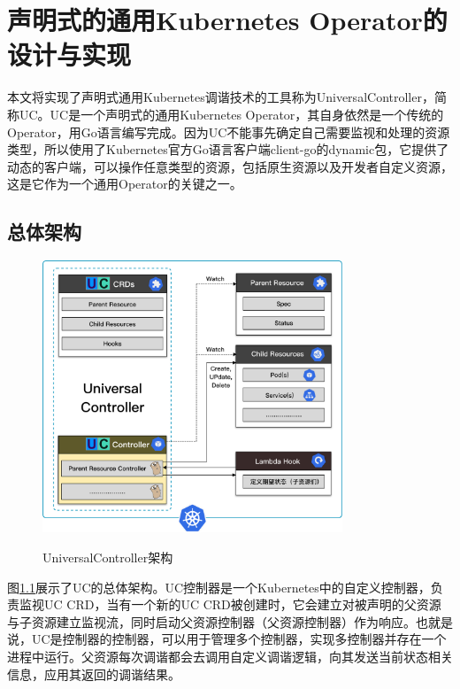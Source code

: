 \documentclass[macfonts,master]{njuthesis}
\begin{document}
\chapter{声明式的通用Kubernetes Operator的设计与实现}\label{chapter_implement}

本文将实现了声明式通用Kubernetes调谐技术的工具称为UniversalController，简称UC。UC是一个声明式的通用Kubernetes Operator，其自身依然是一个传统的Operator，用Go语言编写完成。因为UC不能事先确定自己需要监视和处理的资源类型，所以使用了Kubernetes官方Go语言客户端client-go的dynamic包，它提供了动态的客户端，可以操作任意类型的资源，包括原生资源以及开发者自定义资源，这是它作为一个通用Operator的关键之一。

\section{总体架构}

\begin{figure}[htbp]
  \centering
  \includegraphics[width=0.8\textwidth]{pics/uc-arch.pdf}\\
  \caption{UniversalController架构}\label{fig:uc-arch}
\end{figure}

图\ref{fig:uc-arch}展示了UC的总体架构。UC控制器是一个Kubernetes中的自定义控制器，负责监视UC CRD，当有一个新的UC CRD被创建时，它会建立对被声明的父资源与子资源建立监视流，同时启动父资源控制器（父资源控制器）作为响应。也就是说，UC是控制器的控制器，可以用于管理多个控制器，实现多控制器并存在一个进程中运行。父资源每次调谐都会去调用自定义调谐逻辑，向其发送当前状态相关信息，应用其返回的调谐结果。
\end{document}
